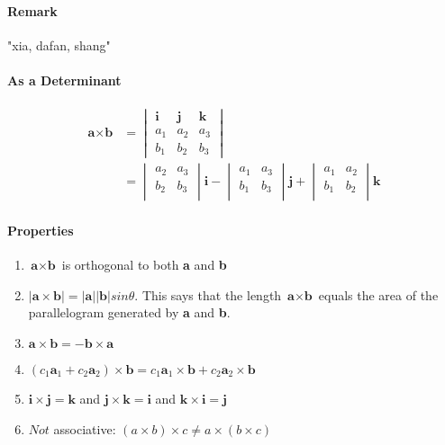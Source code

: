 \documentclass[11pt]{article}
\newcommand{\tb}[1]{\textbf{#1}}
\newcommand{\vi}[0]{\tb{i}}
\newcommand{\vj}[0]{\tb{j}}
\newcommand{\vk}[0]{\tb{k}}
\newcommand{\va}[0]{\tb{a}}
\newcommand{\vb}[0]{\tb{b}}
\begin{document}
\paragraph{Remark} "xia, dafan, shang"
\paragraph{As a Determinant}
\begin{align*}
	\va \times \vb &= \begin{vmatrix}
		\vi & \vj & \vk \\
		a_1 & a_2 & a_3 \\
		b_1 & b_2 & b_3
	\end{vmatrix} \\
	&= \begin{vmatrix}
		a_2 & a_3 \\
		b_2 & b_3 \\
	\end{vmatrix} \vi - \begin{vmatrix}
		a_1 & a_3 \\
		b_1 & b_3 \\
	\end{vmatrix} \vj +  \begin{vmatrix}
		a_1 & a_2 \\
		b_1 & b_2 \\
	\end{vmatrix} \vk
\end{align*}

\paragraph{Properties}
\begin{enumerate}
	\item $\tb{a} \times \tb{b}$ is orthogonal to both \tb{a} and \tb{b}
	\item $|\tb{a} \times \tb{b}| = |\tb{a}||\tb{b}|sin\theta$. This says that the length $\tb{a} \times \tb{b}$ equals the area of the parallelogram generated by \tb{a} and \tb{b}.
	\item $\tb{a} \times \tb{b} = -\tb{b} \times \tb{a}$
	\item $(c_1\tb{a}_1 + c_2\tb{a}_2) \times \tb{b} = c_1\tb{a}_1 \times \tb{b} + c_2\tb{a}_2 \times \tb{b}$
	\item $\tb{i} \times \tb{j} = \tb{k}$ and $\tb{j} \times \tb{k} = \tb{i}$ and $\tb{k} \times \tb{i} = \tb{j}$
	\item $Not$ associative: $(a \times b) \times c \neq a \times (b \times c)$
\end{enumerate} 
\end{document}
